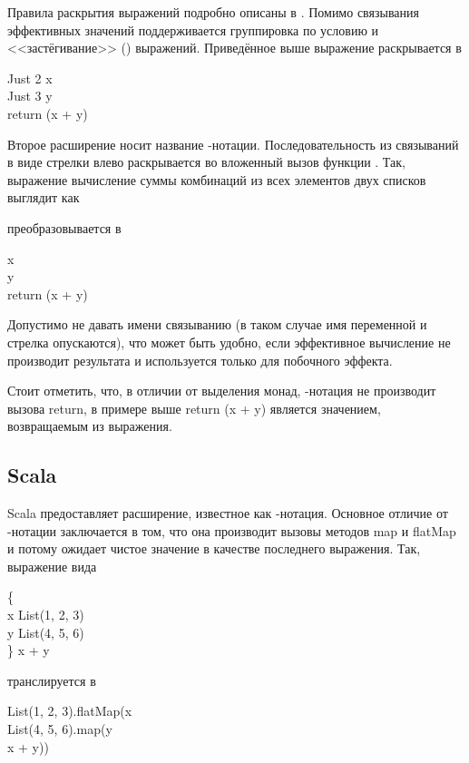 Правила раскрытия выражений подробно описаны в \cite{Giorgidze2011}. Помимо связывания эффективных значений поддерживается группировка по условию и <<застёгивание>> () выражений. Приведённое выше выражение раскрывается в

\begin{haskell}
Just 2 \hsbind \lambda x \to \\
\quad\quad Just 3 \hsbind \lambda y \to \\
\quad\quad\quad return (x + y)
\end{haskell}

Второе расширение носит название \<\>-нотации. Последовательность из связываний в виде стрелки влево раскрывается во вложенный вызов функции \<\hsbind\>. Так, выражение вычисление суммы комбинаций из всех элементов двух списков выглядит как

\begin{haskell}
\end{haskell}
\hspace{0cm}преобразовывается в
\begin{haskell}
[1, 2, 3] \hsbind \lambda x \to \\
\quad\quad [4, 5, 6] \hsbind \lambda y \to \\
\quad\quad\quad return (x + y)
\end{haskell}

Допустимо не давать имени связыванию (в таком случае имя переменной и стрелка опускаются), что может быть удобно, если эффективное вычисление не производит результата и используется только для побочного эффекта.

Стоит отметить, что, в отличии от выделения монад, \<\>-нотация не производит вызова \<return\>, в примере выше \<return (x + y)\> является значением, возвращаемым из выражения.

\subsection{Scala}
Scala предоставляет расширение, известное как \<\>-нотация. Основное отличие от \<\>-нотации заключается в том, что она производит вызовы методов \<map\> и \<flatMap\> и потому ожидает чистое значение в качестве последнего выражения. Так, выражение вида

\begin{haskell}
 \{\\
\quad\quad x \hsfrom List(1, 2, 3) \\
\quad\quad y \hsfrom List(4, 5, 6) \\
\}  x + y
\end{haskell}
\hspace{0cm}транслируется в
\begin{haskell}
List(1, 2, 3).flatMap(x \Rightarrow \\
\quad\quad List(4, 5, 6).map(y \Rightarrow \\
\quad\quad\quad x + y))
\end{haskell}

